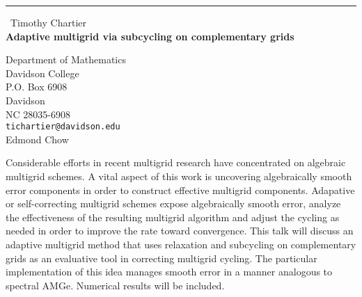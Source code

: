 \documentclass{report}
\begin{document}
\begin{center}
\rule{6in}{1pt} \
{\large Timothy Chartier \\
{\bf Adaptive multigrid via subcycling on complementary grids}}

Department of Mathematics \\ Davidson College \\ P.O. Box 6908 \\ Davidson \\ NC 28035-6908
\\
{\tt tichartier@davidson.edu}\\
Edmond Chow\end{center}

Considerable efforts in recent multigrid research have concentrated on
algebraic multigrid schemes. A vital aspect of this work is uncovering
algebraically smooth error components in order to construct effective
multigrid components. Adapative or self-correcting multigrid schemes
expose algebraically smooth error, analyze the effectiveness of the
resulting multigrid algorithm and adjust the cycling as needed in order
to improve the rate toward convergence. This talk will discuss an
adaptive multigrid method that uses relaxation and subcycling on
complementary grids as an evaluative tool in correcting multigrid
cycling. The particular implementation of this idea manages smooth error
in a manner analogous to spectral AMGe. Numerical results will be
included.
\end{document}
